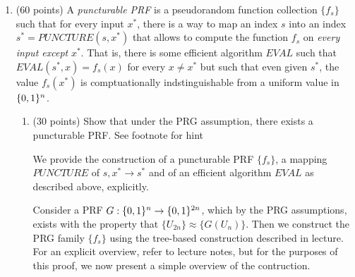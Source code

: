 \documentclass{article}
\begin{document}
\begin{enumerate}
\item{}
(60 points) A \emph{puncturable PRF} is a pseudorandom function collection $\{ f_s \}$ such that for every input $x^*$, there is a way to map an index $s$ into an index $s^*=PUNCTURE(s,x^*)$ that allows to compute the function $f_s$ on \emph{every input except} $x^*$. That is, there is some efficient algorithm $EVAL$ such that $EVAL(s^*,x)=f_s(x)$ for every $x \neq x^*$ but such that even given $s^*$, the value $f_s(x^*)$ is comptuationally indstinguishable  from a uniform value in $\{0,1\}^n$.%

\begin{enumerate}[,label=\alph*.]%

\item{}
(30 points) Show that under the PRG assumption, there exists a puncturable PRF. See footnote for hint%

We provide the construction of a puncturable PRF $\{f_s\}$, a mapping $PUNCTURE$ of $s,x^* \to s^*$
and of an efficient algorithm $EVAL$ as described above, explicitly.%

Consider a PRF $G: \{0,1\}^n \to \{0,1\}^{2n}$, which by the PRG assumptions, exists with the property 
that $\{ U_{2n} \} \approx \{ G(U_n)\}$. Then we construct the PRG family $\{f_s\}$ using the 
tree-based construction described in lecture. For an explicit overview, refer to lecture notes,
but for the purposes of this proof, we now present a simple overview of the contruction.%


\end{enumerate}
\end{enumerate}
\end{document}

